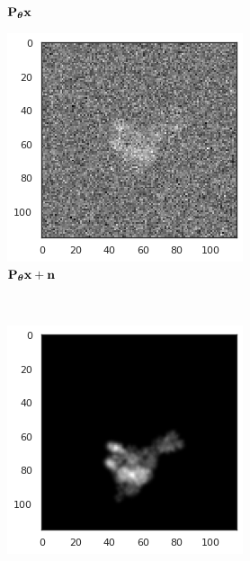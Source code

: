 \begin{figure}[ht!]
\begin{minipage}[b]{0.35\linewidth}
\begin{subfigure}[b]{0.49\linewidth}
            \caption*{$\mathbf{P}_{{\boldsymbol{\theta}}} \mathbf{x}$}
        \end{subfigure}
        \hfill
        \begin{subfigure}[b]{0.49\linewidth}
            \centering
            \includegraphics[width=0.8\linewidth]{figures/5j0n_noise16}
            \caption*{$\mathbf{P}_{{\boldsymbol{\theta}}} \mathbf{x} + \mathbf{n}$}
        \end{subfigure}
        \\ \vspace{1em}
        \begin{subfigure}[b]{0.49\linewidth}
            \centering
            \includegraphics[width=0.8\linewidth]{figures/5j0n_translated}

\end{subfigure}
\end{minipage}
\end{figure}
